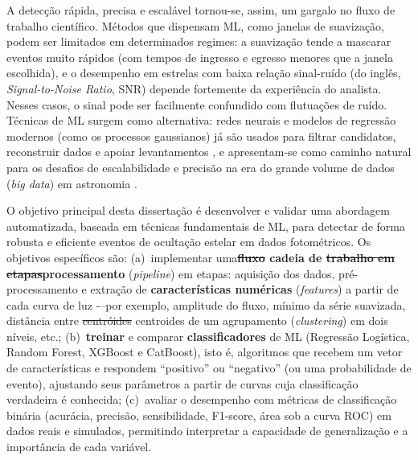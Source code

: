 \documentclass[msc]{on} %
\makeatletter
\providecommand{\DIFaddtex}[1]{{\protect\color{red}#1}} %
\providecommand{\DIFdeltex}[1]{{\protect\color{red}\sout{#1}}} %
\providecommand{\DIFaddbegin}{} %
\providecommand{\DIFaddend}{} %
\providecommand{\DIFdelbegin}{} %
\providecommand{\DIFdelend}{} %
\providecommand{\DIFadd}[1]{\texorpdfstring{\DIFaddtex{#1}}{#1}} %
\providecommand{\DIFdel}[1]{\texorpdfstring{\DIFdeltex{#1}}{}} %
\let\sout@orig\sout %
\renewcommand{\sout}[1]{\ifmmode\text{\sout@orig{\ensuremath{#1}}}\else\sout@orig{#1}\fi} %
\makeatother
\begin{document}
A detecção rápida, precisa e escalável tornou-se, assim, um gargalo no fluxo de trabalho científico. Métodos que dispensam ML, como janelas de suavização, podem ser limitados em determinados regimes: a suavização tende a mascarar eventos muito rápidos (com tempos de ingresso e egresso menores que a janela escolhida), e o desempenho em estrelas com baixa relação sinal-ruído (do inglês, \textit{Signal-to-Noise Ratio}, SNR) depende fortemente da experiência do analista. Nesses casos, o sinal pode ser facilmente confundido com flutuações de ruído. Técnicas de ML surgem como alternativa: redes neurais e modelos de regressão modernos (como os processos gaussianos) já são usados para filtrar candidatos, reconstruir dados e apoiar levantamentos \citep{Deisenroth2019, Fraser2024, CarleoMLPhysSci}, e apresentam-se como caminho natural para os desafios de escalabilidade e precisão na era do grande volume de dados (\textit{big data}) em astronomia \citep{Cazeneuve2023}.

O objetivo principal desta dissertação é desenvolver e validar uma abordagem automatizada, baseada em técnicas fundamentais de ML, para detectar de forma robusta e eficiente eventos de ocultação estelar em dados fotométricos. Os objetivos específicos são: (a)~implementar um\DIFaddbegin \DIFadd{a}\DIFaddend  \textbf{\DIFdelbegin \DIFdel{fluxo }\DIFdelend\ifhmode\hskip0pt\fi \DIFaddbegin \DIFadd{cadeia }\DIFaddend de \DIFdelbegin \DIFdel{trabalho em etapas}\DIFdelend\ifhmode\hskip0pt\fi \DIFaddbegin \DIFadd{processamento}\DIFaddend } (\textit{pipeline}) \DIFaddbegin \DIFadd{em etapas}\DIFaddend : aquisição dos dados, pré-processamento e extração de \textbf{características numéricas} (\textit{features}) a partir de cada curva de luz -\DIFaddbegin \DIFadd{--}\DIFaddend  por exemplo, amplitude do fluxo, mínimo da série suavizada, distância entre \DIFdelbegin \DIFdel{centróides }\DIFdelend\ifhmode\hskip0pt\fi \DIFaddbegin \DIFadd{centroides }\DIFaddend de um agrupamento \DIFaddbegin \DIFadd{(}\textit{\DIFadd{clustering}}\DIFadd{) }\DIFaddend em dois níveis, etc.; (b)~\textbf{treinar} e comparar \textbf{classificadores} de ML (Regressão Logística, Random Forest, XGBoost e CatBoost), isto é, algoritmos que recebem um vetor de características e respondem ``positivo'' ou ``negativo'' (ou uma probabilidade de evento), ajustando seus parâmetros a partir de curvas cuja classificação verdadeira é conhecida; (c)~avaliar o desempenho com métricas de classificação binária (acurácia, precisão, sensibilidade, F1-score, área sob a curva ROC) em dados reais e simulados, permitindo interpretar a capacidade de generalização e a importância de cada variável.
\end{document}
